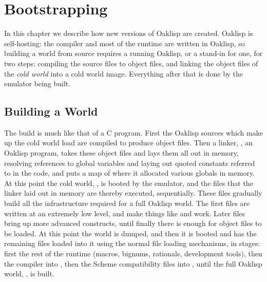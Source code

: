%
%
%


\chapter{Bootstrapping} \label{sec:boot}

In this chapter we describe how new versions of Oaklisp are created.
Oaklisp is self-hosting: the compiler and most of the runtime are
written in Oaklisp, so building a world from source requires a
running Oaklisp, or a stand-in for one, for two steps: compiling the
 source files to  object files, and linking the
object files of the \emph{cold world} into a cold world image.
Everything after that is done by the emulator being built.

\section{Building a World}

The build is much like that of a C program.  First the Oaklisp
sources which make up the cold world load are compiled to produce
object files.  Then a linker, , an Oaklisp program,
takes these object files and lays them all out in memory, resolving
references to global variables and laying out quoted constants
referred to in the code, and puts a map of where it allocated various
globals in memory.  At this point the cold world, , is
booted by the emulator, and the files that the linker laid out in
memory are thereby executed, sequentially.  These files gradually
build all the infrastructure required for a full Oaklisp world.  The
first files are written at an extremely low level, and make things
like  and  work.  Later files bring up more
advanced constructs, until finally there is enough for object files
to be loaded.  At this point the world is dumped, and then it is
booted and has the remaining files loaded into it using the normal
file loading mechanisms, in stages: first the rest of the runtime
(macros, bignums, rationals, development tools), then the compiler
into , then the Scheme compatibility files into
, until the full Oaklisp world, ,
is built.

